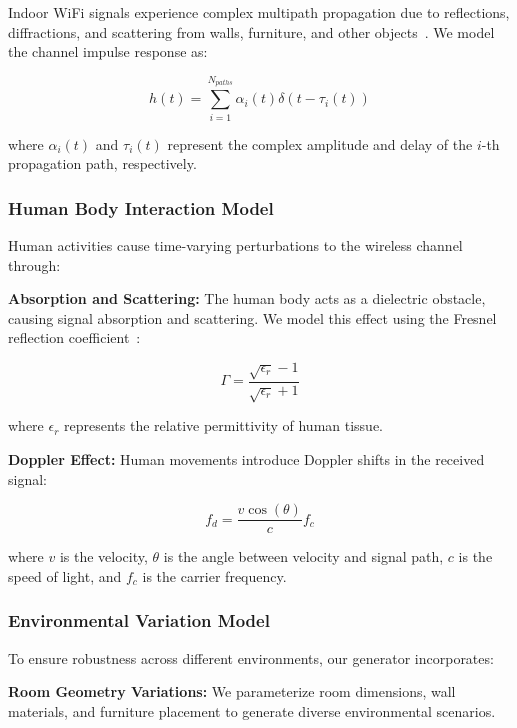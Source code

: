 \documentclass[journal]{IEEEtran}
\begin{document}
Indoor WiFi signals experience complex multipath propagation due to reflections, diffractions, and scattering from walls, furniture, and other objects~\cite{multipath_fading2003}. We model the channel impulse response as:

\begin{equation}
h(t) = \sum_{i=1}^{N_{paths}} \alpha_i(t) \delta(t - \tau_i(t))
\end{equation}

where $\alpha_i(t)$ and $\tau_i(t)$ represent the complex amplitude and delay of the $i$-th propagation path, respectively.

\subsubsection{Human Body Interaction Model}

Human activities cause time-varying perturbations to the wireless channel through:

\textbf{Absorption and Scattering:} The human body acts as a dielectric obstacle, causing signal absorption and scattering. We model this effect using the Fresnel reflection coefficient~\cite{fresnel_reflection1995}:

\begin{equation}
\Gamma = \frac{\sqrt{\epsilon_r} - 1}{\sqrt{\epsilon_r} + 1}
\end{equation}

where $\epsilon_r$ represents the relative permittivity of human tissue.

\textbf{Doppler Effect:} Human movements introduce Doppler shifts in the received signal:

\begin{equation}
f_d = \frac{v \cos(\theta)}{c} f_c
\end{equation}

where $v$ is the velocity, $\theta$ is the angle between velocity and signal path, $c$ is the speed of light, and $f_c$ is the carrier frequency.

\subsubsection{Environmental Variation Model}

To ensure robustness across different environments, our generator incorporates:

\textbf{Room Geometry Variations:} We parameterize room dimensions, wall materials, and furniture placement to generate diverse environmental scenarios.
\end{document}
